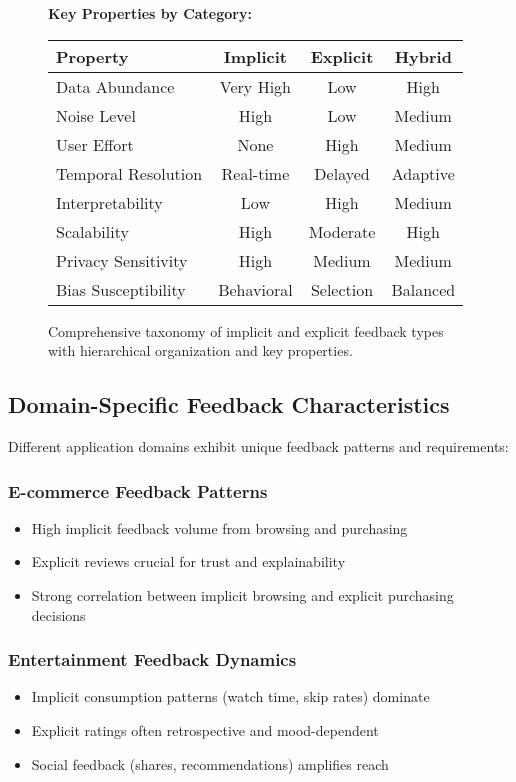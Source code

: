 \documentclass[acmsmall,review,anonymous]{acmart}
\begin{document}
\begin{figure}[h]
{\begin{minipage}{0.9\textwidth}
\textbf{Key Properties by Category:}
\begin{tabular}{@{}lccc@{}}
\toprule
Property & Implicit & Explicit & Hybrid \\
\midrule
Data Abundance & Very High & Low & High \\
Noise Level & High & Low & Medium \\
User Effort & None & High & Medium \\
Temporal Resolution & Real-time & Delayed & Adaptive \\
Interpretability & Low & High & Medium \\
Scalability & High & Moderate & High \\
Privacy Sensitivity & High & Medium & Medium \\
Bias Susceptibility & Behavioral & Selection & Balanced \\
\bottomrule
\end{tabular}
\end{minipage}
}
\caption{Comprehensive taxonomy of implicit and explicit feedback types with hierarchical organization and key properties.}
\label{fig:comprehensive_taxonomy}
\end{figure}

\subsection{Domain-Specific Feedback Characteristics}

Different application domains exhibit unique feedback patterns and requirements:

\subsubsection{E-commerce Feedback Patterns}
\begin{itemize}
    \item High implicit feedback volume from browsing and purchasing
    \item Explicit reviews crucial for trust and explainability
    \item Strong correlation between implicit browsing and explicit purchasing decisions
\end{itemize}

\subsubsection{Entertainment Feedback Dynamics}
\begin{itemize}
    \item Implicit consumption patterns (watch time, skip rates) dominate
    \item Explicit ratings often retrospective and mood-dependent
    \item Social feedback (shares, recommendations) amplifies reach
\end{itemize}
\end{document}

